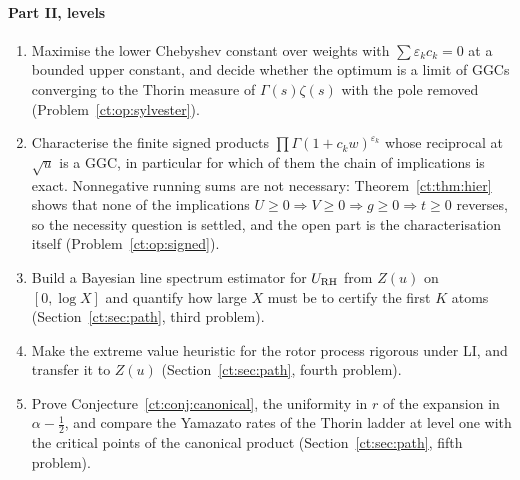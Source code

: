\paragraph{Part II, levels}
\begin{enumerate}
\item Maximise the lower Chebyshev constant over weights with $\sum\varepsilon_kc_k=0$ at a bounded upper constant, and decide whether the optimum is a limit of GGCs converging to the Thorin measure of $\Gamma(s)\zeta(s)$ with the pole removed (Problem~\ref{ct:op:sylvester}).
\item Characterise the finite signed products $\prod\Gamma(1+c_kw)^{\varepsilon_k}$ whose reciprocal at $\sqrt u$ is a GGC, in particular for which of them the chain of implications is exact. Nonnegative running sums are not necessary: Theorem~\ref{ct:thm:hier} shows that none of the implications $U\ge0\Rightarrow V\ge0\Rightarrow g\ge0\Rightarrow t\ge0$ reverses, so the necessity question is settled, and the open part is the characterisation itself (Problem~\ref{ct:op:signed}).
\item Build a Bayesian line spectrum estimator for $U_{\rm RH}$ from $Z(u)$ on $[0,\log X]$ and quantify how large $X$ must be to certify the first $K$ atoms (Section~\ref{ct:sec:path}, third problem).
\item Make the extreme value heuristic for the rotor process rigorous under LI, and transfer it to $Z(u)$ (Section~\ref{ct:sec:path}, fourth problem).
\item Prove Conjecture~\ref{ct:conj:canonical}, the uniformity in $r$ of the expansion in $\alpha-\frac12$, and compare the Yamazato rates of the Thorin ladder at level one with the critical points of the canonical product (Section~\ref{ct:sec:path}, fifth problem).
\end{enumerate}

